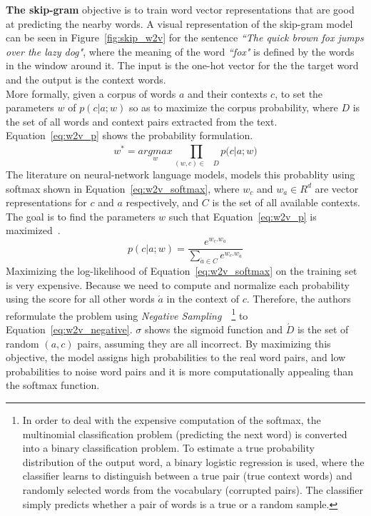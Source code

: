 \noindent
\textbf{The skip-gram} objective is to train word vector representations that are good at predicting the nearby words. A visual representation of the skip-gram model can be seen in Figure~\ref{fig:skip_w2v} for the sentence \emph{``The quick brown fox jumps over the lazy dog"}, where the meaning of the word \emph{``fox"} is defined by the words in the window around it. The input is the one-hot vector for the the target word and the output is the context words.\\
More formally, given a corpus of words $a$ and their contexts $c$, to set the parameters $w$ of $p(c|a; w)$ so as to maximize the corpus probability, where $D$ is the set of all words and context pairs extracted from the text. Equation~\ref{eq:w2v_p} shows the probability formulation.
\begin{equation}
\label{eq:w2v_p}
w^*=\underset { w  }{ { argmax } } \prod _{ (w,c)\in \quad D }^{  }{ p(c|a; } w )
\end{equation}
The literature on neural-network language models, models this probablity using softmax shown in Equation~\ref{eq:w2v_softmax}, where $w_c$ and $ w_a\in R^d$ are vector representations for $c$ and $a$ respectively, and
$C$ is the set of all available contexts. The goal is to find the parameters $w$ such that Equation~\ref{eq:w2v_p} is maximized~. 
\begin{equation}
\label{eq:w2v_softmax}
p(c|a;w)=\frac { { e }^{ w_{ c }.w_{ a } } }{ \sum _{ \acute { a } \in C }^{  }{ { e }^{ w_{ c }.w_{ \acute { a }  } } }  } 
\end{equation}
Maximizing the log-likelihood of Equation~\ref{eq:w2v_softmax} on the training set is very expensive. Because we need to compute and normalize each probability using the score for all other words  $\acute { a }$ in the context of $c$. Therefore, the authors reformulate the problem using \emph{Negative Sampling}~~\footnote{ In order to deal with the expensive computation of the softmax, the multinomial classification problem (predicting the next word) is converted into a binary classification problem. To estimate a true probability distribution of the output word, a binary logistic regression is used, where the classifier learns to distinguish between  a true pair (true context words) and randomly selected words from the vocabulary (corrupted pairs). The classifier simply predicts whether a pair of words is a true or a random sample. } to Equation~\ref{eq:w2v_negative}. $ \sigma$ shows the sigmoid function and $\acute{D}$ is the set of random $(a, c)$ pairs, assuming they are all incorrect. By maximizing this objective, the model assigns high probabilities to the real word pairs, and low probabilities to noise word pairs and it is more computationally appealing than the softmax function.

